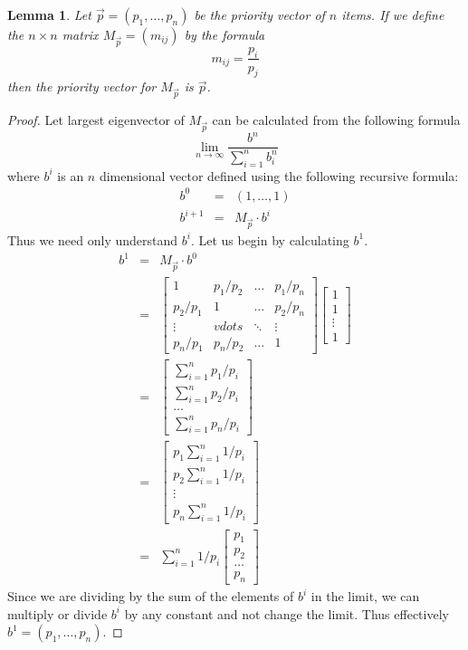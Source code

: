 \documentclass[10pt,twoside]{article}
\newtheorem{lemma}{Lemma}
\begin{document}
\begin{lemma}
Let $\vec{p}=(p_1, \ldots, p_n)$ be the priority vector of $n$ items.  If we define
the $n\times n$ matrix $M_{\vec{p}}=(m_{ij})$ by the formula
$$m_{ij} = \frac{p_i}{p_j}$$
then the priority vector for $M_{\vec{p}}$ is $\vec{p}$.
\end{lemma}
\begin{proof}
Let largest eigenvector of $M_{\vec{p}}$ can be calculated from the following formula
$$\lim_{n \to \infty} \frac{b^n}{\sum_{i=1}^n b^n_i}$$
where $b^i$ is an $n$ dimensional vector defined using the following recursive formula:
\begin{eqnarray*}
	b^0 &=& (1, \ldots, 1) \\
	b^{i+1} &=& M_{\vec{p}} \cdot b^i
\end{eqnarray*}	
Thus we need only understand $b^i$.  Let us begin by calculating 
$b^1$.
\begin{eqnarray*}
	b^1 &=& M_{\vec{p}} \cdot b^0 \\
	&=&
	\begin{bmatrix}
	1 & p_1/p_2 & \ldots & p_1/p_n\\
	p_2/p_1 & 1 & \ldots & p_2/p_n \\
	\vdots & vdots & \ddots & \vdots \\
	p_n/p_1 & p_n/p_2 & \ldots & 1	
	\end{bmatrix}
	\begin{bmatrix}
	1 \\
	1 \\
	\vdots \\
	1
	\end{bmatrix} \\
	&=& \begin{bmatrix}
	\sum_{i=1}^n p_1/p_i	 \\
	\sum_{i=1}^n p_2/p_i	 \\
	\ldots \\
	\sum_{i=1}^n p_n/p_i	
	\end{bmatrix} \\
	&=& 
	\begin{bmatrix}
		p_1 \sum_{i=1}^n 1/p_i \\
		p_2 \sum_{i=1}^n 1/p_i \\
		\vdots \\
		p_n \sum_{i=1}^n 1/p_i
	\end{bmatrix} \\
	&=&\sum_{i=1}^n 1/p_i
	\begin{bmatrix}
	p_1 \\
	p_2 \\
	\ldots \\
	p_n	
	\end{bmatrix}
\end{eqnarray*}
Since we are dividing by the sum of the elements of $b^i$ in the limit, we can
multiply or divide $b^i$ by any constant and not change the limit.  Thus effectively
$b^1 = (p_1, \ldots, p_n)$.


\end{proof}
\end{document}
